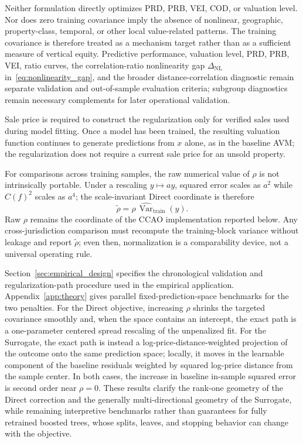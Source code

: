 \documentclass[10pt]{article}
\theoremstyle{definition}
\newcommand{\Var}{\operatorname{Var}}
\newcommand{\1}{\mathbf{1}}
\begin{document}
{Neither formulation directly optimizes PRD, PRB, VEI, COD, or valuation level. Nor does zero training covariance imply the absence of nonlinear, geographic, property-class, temporal, or other local value-related patterns. The training covariance is therefore treated as a mechanism target rather than as a sufficient measure of vertical equity. Predictive performance, valuation level, PRD, PRB, VEI, ratio curves, the correlation-ratio nonlinearity gap $\Delta_{\mathrm{NL}}$ in~\eqref{eq:nonlinearity_gap}, and the broader distance-correlation diagnostic remain separate validation and out-of-sample evaluation criteria; subgroup diagnostics remain necessary complements for later operational validation.}

{Sale price is required to construct the regularization only for verified sales used during model fitting. Once a model has been trained, the resulting valuation function continues to generate predictions from $x$ alone, as in the baseline AVM; the regularization does not require a current sale price for an unsold property.}

For comparisons across training samples, the raw numerical value of $\rho$ is not intrinsically portable. Under a rescaling $y\mapsto ay$, squared error scales as $a^2$ while $C(f)^2$ scales as $a^4$; the scale-invariant Direct coordinate is therefore
\begin{equation}
\label{eq:normalized_rho}
\widetilde\rho=\rho\,\widehat{\Var}_{\mathrm{train}}(y).
\end{equation}
Raw $\rho$ remains the coordinate of the CCAO implementation reported below. Any cross-jurisdiction comparison must recompute the training-block variance without leakage and report $\widetilde\rho$; even then, normalization is a comparability device, not a universal operating rule.


Section~\ref{sec:empirical_design} specifies the chronological validation and regularization-path procedure used in the empirical application. Appendix~\ref{app:theory} gives parallel fixed-prediction-space benchmarks for the two penalties. For the Direct objective, increasing $\rho$ shrinks the targeted covariance smoothly and, when the space contains an intercept, the exact path is a one-parameter centered spread rescaling of the unpenalized fit. For the Surrogate, the exact path is instead a log-price-distance-weighted projection of the outcome onto the same prediction space; locally, it moves in the learnable component of the baseline residuals weighted by squared log-price distance from the sample center. In both cases, the increase in baseline in-sample squared error is second order near $\rho=0$. These results clarify the rank-one geometry of the Direct correction and the generally multi-directional geometry of the Surrogate, while remaining interpretive benchmarks rather than guarantees for fully retrained boosted trees, whose splits, leaves, and stopping behavior can change with the objective.
\end{document}
